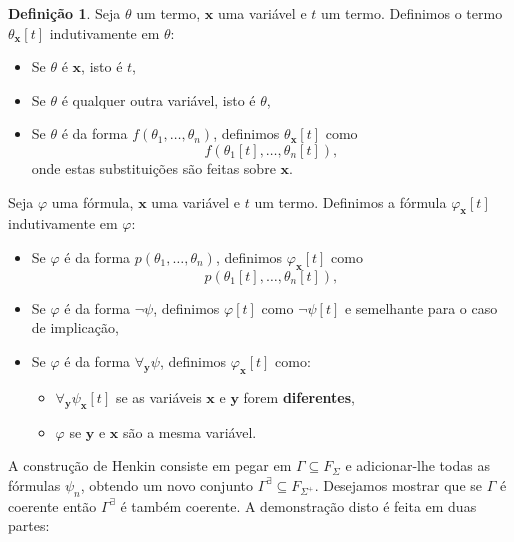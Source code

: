 \documentclass{report}
\theoremstyle{definition}
\newtheorem{definicao}{Definição}
\theoremstyle{remark}
\renewcommand{\bf}[1]{\mathbf{#1}}
\begin{document}
	\begin{definicao}
	Seja $\theta$ um termo, $\bf x$ uma variável e $t$ um termo. Definimos o termo $\theta_{\bf x}[t]$ indutivamente em $\theta$:
	
	\begin{itemize}
	\item Se $\theta$ é $\bf x$, isto é $t$,
	
	\item Se $\theta$ é qualquer outra variável, isto é $\theta$,
	
	\item Se $\theta$ é da forma $f(\theta_1, \dots, \theta_n)$, definimos $\theta_{\bf x}[t]$ como
	\[f(\theta_1[t], \dots, \theta_n[t]),\]
	onde estas substituições são feitas sobre $\bf x$.
	\end{itemize}
	
	Seja $\varphi$ uma fórmula, $\bf x$ uma variável e $t$ um termo. Definimos a fórmula $\varphi_{\bf x}[t]$ indutivamente em $\varphi$:
	
	\begin{itemize}
	\item Se $\varphi$ é da forma $p(\theta_1, \dots, \theta_n)$, definimos $\varphi_{\bf x}[t]$ como
	\[p(\theta_1[t], \dots, \theta_n[t]),\]
	
	\item Se $\varphi$ é da forma $\neg \psi$, definimos $\varphi[t]$ como $\neg \psi[t]$ e semelhante para o caso de implicação,
	
	\item Se $\varphi$ é da forma $\forall_{\bf y} \psi$, definimos $\varphi_{\bf x}[t]$ como:
	
	\begin{itemize}
	\item $\forall_{\bf y} \psi_{\bf x}[t]$ se as variáveis $\bf x$ e $\bf y$ forem \textbf{diferentes},
	
	\item $\varphi$ se $\bf y$ e $\bf x$ são a mesma variável.
	\end{itemize}
	\end{itemize}
	\end{definicao}
	
	A construção de Henkin consiste em pegar em $\Gamma \subseteq F_{\Sigma}$ e adicionar-lhe todas as fórmulas $\psi_n$, obtendo um novo conjunto $\Gamma^\exists \subseteq F_{\Sigma^+}$. Desejamos mostrar que se $\Gamma$ é coerente então $\Gamma^\exists$ é também coerente. A demonstração disto é feita em duas partes:
	
\end{document}
